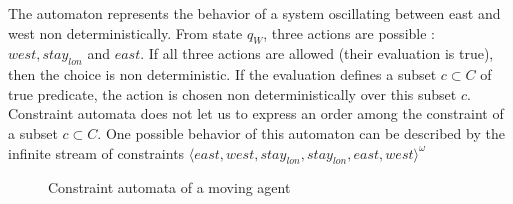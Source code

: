 \begin{example}
The automaton represents the behavior of a system oscillating between east and west non deterministically. From state $q_W$, three actions are possible : $west, stay_{lon} $ and $east$. If all three actions are allowed (their evaluation is true), then the choice is non deterministic. If the evaluation defines a subset $c \subset C$ of true predicate, the action is chosen non deterministically over this subset $c$. Constraint automata does not let us to express an order among the constraint of a subset $c \subset C$. One possible behavior of this automaton can be described by the infinite stream of constraints $\langle east,west,stay_{lon},stay_{lon},east,west \rangle ^{\omega}$

	\begin{figure}[H]
		\centering
		\resizebox{8cm}{!}{}
		\caption{Constraint automata of a moving agent}
		\label{moveCA}
	\end{figure}
\end{example}
